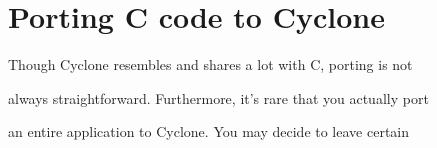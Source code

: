 \section{Porting C code to Cyclone}







\ifscreen


\newenvironment{porta}[2]{%


  \begin{list}{}{}%


  \item[\hypertarget{#1}{\colorbox{lightblue}{\textbf{#2}}}]}{\end{list}}


\else


\newenvironment{porta}[2]{%


  \begin{list}{}{}%


  \item[\hypertarget{#1}{\textbf{#2}}]}{\end{list}}


\fi





















Though Cyclone resembles and shares a lot with C, porting is not


always straightforward.  Furthermore, it's rare that you actually port


an entire application to Cyclone.  You may decide to leave certain


